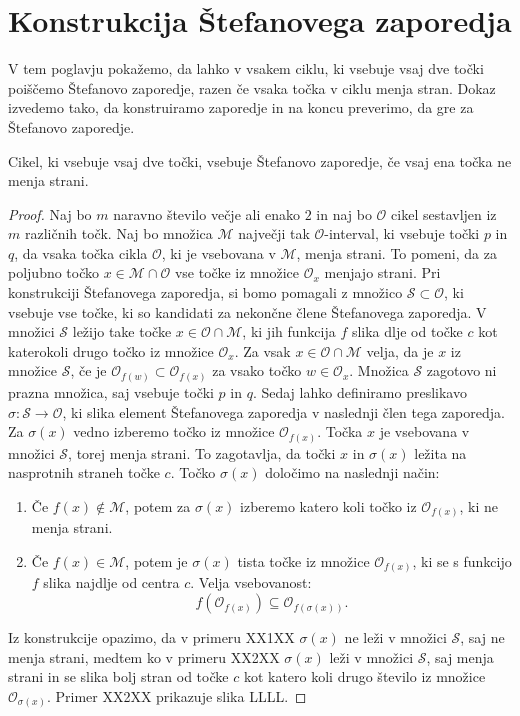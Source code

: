 \documentclass[mat2]{fmfdelo}
\begin{document}
\section{Konstrukcija Štefanovega zaporedja} \label{konssz}
V tem poglavju pokažemo, da lahko v vsakem ciklu, ki vsebuje vsaj dve točki poiščemo Štefanovo zaporedje, razen če vsaka točka v ciklu menja stran. Dokaz izvedemo tako, da konstruiramo zaporedje in na koncu preverimo, da gre za Štefanovo zaporedje.
\begin{trditev}
Cikel, ki vsebuje vsaj dve točki, vsebuje Štefanovo zaporedje, če vsaj ena točka ne menja strani.
\end{trditev}
\begin{proof}
Naj bo $m$ naravno število večje ali enako $2$ in naj bo $\mathcal{O}$ cikel sestavljen iz $m$ različnih točk. Naj bo množica $\mathcal{M}$ največji tak $\mathcal{O}$-interval, ki vsebuje točki $p$ in $q$, da vsaka točka cikla $\mathcal{O}$, ki je vsebovana v $\mathcal{M}$, menja strani. To pomeni, da za poljubno točko $x \in \mathcal{M} \cap \mathcal{O}$ vse točke iz množice $\mathcal{O}_x$ menjajo strani. Pri konstrukciji Štefanovega zaporedja, si bomo pomagali z množico $\mathcal{S} \subset \mathcal{O}$, ki vsebuje vse točke, ki so kandidati za nekončne člene Štefanovega zaporedja. V množici $\mathcal{S}$ ležijo take točke $x \in \mathcal{O} \cap \mathcal{M}$, ki jih funkcija $f$ slika dlje od točke $c$ kot katerokoli drugo točko iz množice $\mathcal{O}_x$. Za vsak $x \in \mathcal{O} \cap \mathcal{M}$ velja, da je $x$ iz množice $\mathcal{S}$, če je $\mathcal{O}_{f(w)} \subset \mathcal{O}_{f(x)}$ za vsako točko $w \in \mathcal{O}_x$. Množica $\mathcal{S}$ zagotovo ni prazna množica, saj vsebuje točki $p$ in $q$. Sedaj lahko definiramo preslikavo $\sigma : \mathcal{S} \to \mathcal{O}$, ki slika element Štefanovega zaporedja v naslednji člen tega zaporedja. Za $\sigma(x)$ vedno izberemo točko iz množice $\mathcal{O}_{f(x)}$. Točka $x$ je vsebovana v množici $\mathcal{S}$, torej menja strani. To zagotavlja, da točki $x$ in $\sigma(x)$ ležita na nasprotnih straneh točke $c$. Točko $\sigma(x)$ določimo na naslednji način:
\begin{enumerate}
\item Če $f(x) \notin \mathcal{M}$, potem za $\sigma(x)$ izberemo katero koli točko iz $\mathcal{O}_{f(x)}$, ki ne menja strani.
\item Če $f(x) \in \mathcal{M}$, potem je $\sigma(x)$ tista točke iz množice $\mathcal{O}_{f(x)}$, ki se s funkcijo $f$ slika najdlje od centra $c$. Velja vsebovanost:
$$f(\mathcal{O}_{f(x)}) \subseteq \mathcal{O}_{f(\sigma(x))}.$$
\end{enumerate}
Iz konstrukcije opazimo, da v primeru XX1XX $\sigma(x)$ ne leži v množici $\mathcal{S}$, saj ne menja strani, medtem ko v primeru XX2XX $\sigma(x)$ leži v množici $\mathcal{S}$, saj menja strani in se slika bolj stran od točke $c$ kot katero koli drugo število iz množice $\mathcal{O}_{\sigma(x)}$. Primer XX2XX prikazuje slika LLLL.


\end{proof}
\end{document}
